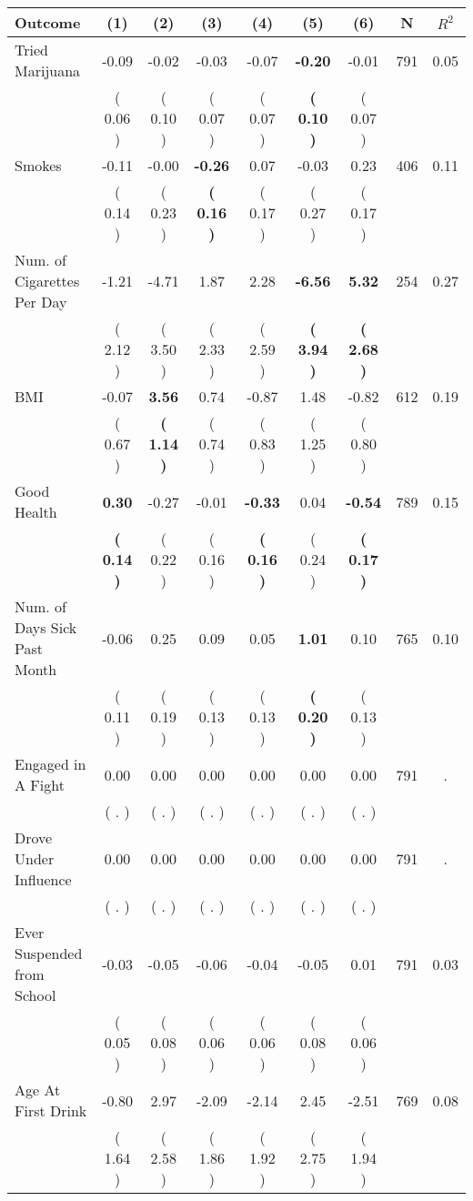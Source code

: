 \begin{tabular}{lcccccccc}
\toprule
 \textbf{Outcome} & \textbf{(1)} & \textbf{(2)} & \textbf{(3)} & \textbf{(4)} & \textbf{(5)} & \textbf{(6)} & \textbf{N} & \textbf{$ R^2$} \\
\midrule
Tried Marijuana &     -0.09 &     -0.02 &     -0.03 &     -0.07 & \textbf{    -0.20} &     -0.01 & 791 &       0.05 \\ 
 & (     0.06 ) & (     0.10 ) & (     0.07 ) & (     0.07 ) & \textbf{(     0.10 )} & (     0.07 ) & \\
Smokes &     -0.11 &     -0.00 & \textbf{    -0.26} &      0.07 &     -0.03 &      0.23 & 406 &       0.11 \\ 
 & (     0.14 ) & (     0.23 ) & \textbf{(     0.16 )} & (     0.17 ) & (     0.27 ) & (     0.17 ) & \\
Num. of Cigarettes Per Day &     -1.21 &     -4.71 &      1.87 &      2.28 & \textbf{    -6.56} & \textbf{     5.32} & 254 &       0.27 \\ 
 & (     2.12 ) & (     3.50 ) & (     2.33 ) & (     2.59 ) & \textbf{(     3.94 )} & \textbf{(     2.68 )} & \\
BMI &     -0.07 & \textbf{     3.56} &      0.74 &     -0.87 &      1.48 &     -0.82 & 612 &       0.19 \\ 
 & (     0.67 ) & \textbf{(     1.14 )} & (     0.74 ) & (     0.83 ) & (     1.25 ) & (     0.80 ) & \\
Good Health & \textbf{     0.30} &     -0.27 &     -0.01 & \textbf{    -0.33} &      0.04 & \textbf{    -0.54} & 789 &       0.15 \\ 
 & \textbf{(     0.14 )} & (     0.22 ) & (     0.16 ) & \textbf{(     0.16 )} & (     0.24 ) & \textbf{(     0.17 )} & \\
Num. of Days Sick Past Month &     -0.06 &      0.25 &      0.09 &      0.05 & \textbf{     1.01} &      0.10 & 765 &       0.10 \\ 
 & (     0.11 ) & (     0.19 ) & (     0.13 ) & (     0.13 ) & \textbf{(     0.20 )} & (     0.13 ) & \\
Engaged in A Fight &      0.00 &      0.00 &      0.00 &      0.00 &      0.00 &      0.00 & 791 &          . \\ 
 & (        . ) & (        . ) & (        . ) & (        . ) & (        . ) & (        . ) & \\
Drove Under Influence &      0.00 &      0.00 &      0.00 &      0.00 &      0.00 &      0.00 & 791 &          . \\ 
 & (        . ) & (        . ) & (        . ) & (        . ) & (        . ) & (        . ) & \\
Ever Suspended from School &     -0.03 &     -0.05 &     -0.06 &     -0.04 &     -0.05 &      0.01 & 791 &       0.03 \\ 
 & (     0.05 ) & (     0.08 ) & (     0.06 ) & (     0.06 ) & (     0.08 ) & (     0.06 ) & \\
Age At First Drink &     -0.80 &      2.97 &     -2.09 &     -2.14 &      2.45 &     -2.51 & 769 &       0.08 \\ 
 & (     1.64 ) & (     2.58 ) & (     1.86 ) & (     1.92 ) & (     2.75 ) & (     1.94 ) & \\
\bottomrule
\end{tabular}
